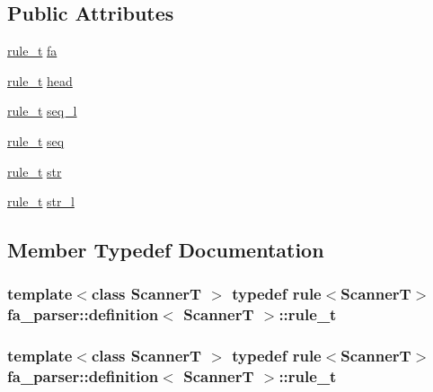 \subsection*{Public Attributes}
\begin{DoxyCompactItemize}
\item 
\hyperlink{structfa__parser_1_1definition_afa348afda38b7917e6a6b9ab5bf954fd}{rule\+\_\+t} \hyperlink{structfa__parser_1_1definition_a48eca12d36bc711248eebb4f850a83c8}{fa}
\item 
\hyperlink{structfa__parser_1_1definition_afa348afda38b7917e6a6b9ab5bf954fd}{rule\+\_\+t} \hyperlink{structfa__parser_1_1definition_a9ac398c08482622c6231ca45ae3637c7}{head}
\item 
\hyperlink{structfa__parser_1_1definition_afa348afda38b7917e6a6b9ab5bf954fd}{rule\+\_\+t} \hyperlink{structfa__parser_1_1definition_acb61c19eed7df6831e569ba26e260f71}{seq\+\_\+l}
\item 
\hyperlink{structfa__parser_1_1definition_afa348afda38b7917e6a6b9ab5bf954fd}{rule\+\_\+t} \hyperlink{structfa__parser_1_1definition_af773d1e41b99324de86ac074ef275379}{seq}
\item 
\hyperlink{structfa__parser_1_1definition_afa348afda38b7917e6a6b9ab5bf954fd}{rule\+\_\+t} \hyperlink{structfa__parser_1_1definition_a9b16d6bb1530e878a04ccd364dc2302e}{str}
\item 
\hyperlink{structfa__parser_1_1definition_afa348afda38b7917e6a6b9ab5bf954fd}{rule\+\_\+t} \hyperlink{structfa__parser_1_1definition_a458a9f843e27dd3579418e2f1f39d4d0}{str\+\_\+l}
\end{DoxyCompactItemize}


\subsection{Member Typedef Documentation}
\hypertarget{structfa__parser_1_1definition_afa348afda38b7917e6a6b9ab5bf954fd}{
\subsubsection[{rule\+\_\+t}]{\setlength{\rightskip}{0pt plus 5cm}template$<$class Scanner\+T $>$ typedef rule$<$Scanner\+T$>$ {\bf fa\+\_\+parser\+::definition}$<$ Scanner\+T $>$\+::{\bf rule\+\_\+t}}}\label{structfa__parser_1_1definition_afa348afda38b7917e6a6b9ab5bf954fd}
\hypertarget{structfa__parser_1_1definition_afa348afda38b7917e6a6b9ab5bf954fd}{
\subsubsection[{rule\+\_\+t}]{\setlength{\rightskip}{0pt plus 5cm}template$<$class Scanner\+T $>$ typedef rule$<$Scanner\+T$>$ {\bf fa\+\_\+parser\+::definition}$<$ Scanner\+T $>$\+::{\bf rule\+\_\+t}}}\label{structfa__parser_1_1definition_afa348afda38b7917e6a6b9ab5bf954fd}


